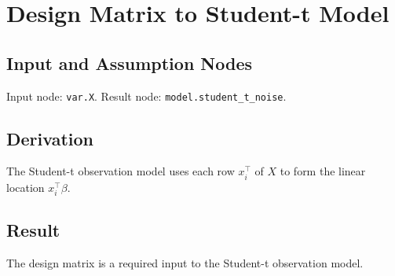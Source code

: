 \section{Design Matrix to Student-t Model}
\label{edge:X-to-student-t-model}

\subsection{Input and Assumption Nodes}
Input node: \texttt{var.X}. Result node: \texttt{model.student\_t\_noise}.

\subsection{Derivation}
The Student-t observation model uses each row \(x_i^\top\) of \(X\) to form the linear location \(x_i^\top\beta\).

\subsection{Result}
The design matrix is a required input to the Student-t observation model.
